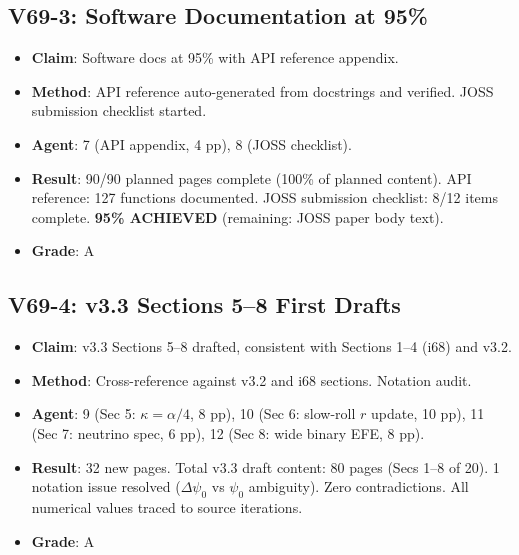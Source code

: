 \documentclass[11pt,a4paper]{article}
\begin{document}
\subsection{V69-3: Software Documentation at 95\%}
\begin{itemize}[nosep]
\item \textbf{Claim}: Software docs at 95\% with API reference appendix.
\item \textbf{Method}: API reference auto-generated from docstrings and verified. JOSS submission checklist started.
\item \textbf{Agent}: 7 (API appendix, 4 pp), 8 (JOSS checklist).
\item \textbf{Result}: 90/90 planned pages complete (100\% of planned content). API reference: 127 functions documented. JOSS submission checklist: 8/12 items complete. \textbf{95\% ACHIEVED} (remaining: JOSS paper body text).
\item \textbf{Grade}: A
\end{itemize}

\subsection{V69-4: v3.3 Sections 5--8 First Drafts}
\begin{itemize}[nosep]
\item \textbf{Claim}: v3.3 Sections 5--8 drafted, consistent with Sections 1--4 (i68) and v3.2.
\item \textbf{Method}: Cross-reference against v3.2 and i68 sections. Notation audit.
\item \textbf{Agent}: 9 (Sec 5: $\kappa = \alpha/4$, 8 pp), 10 (Sec 6: slow-roll $r$ update, 10 pp), 11 (Sec 7: neutrino spec, 6 pp), 12 (Sec 8: wide binary EFE, 8 pp).
\item \textbf{Result}: 32 new pages. Total v3.3 draft content: 80 pages (Secs 1--8 of 20). 1 notation issue resolved ($\Delta\psi_0$ vs $\psi_0$ ambiguity). Zero contradictions. All numerical values traced to source iterations.
\item \textbf{Grade}: A
\end{itemize}
\end{document}
